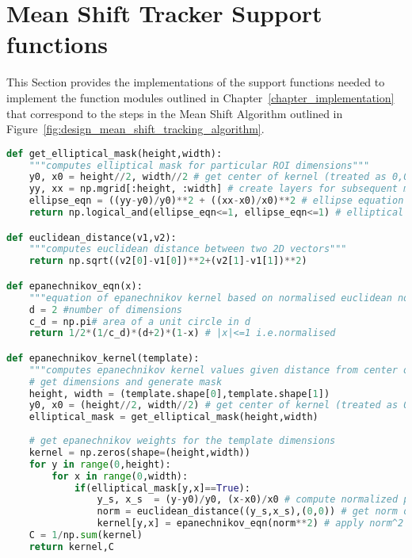 \section{Mean Shift Tracker Support functions}\label{supportMS}
This Section provides the implementations of the support functions needed to
implement the function modules outlined in Chapter~\ref{chapter_implementation}
that correspond to the steps in the Mean Shift Algorithm outlined in
Figure~\ref{fig:design_mean_shift_tracking_algorithm}.

\begin{lstlisting}[language=Python, caption={Additional functions for Mean Shift Tracker Impementation}, captionpos=b, label={lst:support_MS}]
def get_elliptical_mask(height,width):
    """computes elliptical mask for particular ROI dimensions"""
    y0, x0 = height//2, width//2 # get center of kernel (treated as 0,0) - note these are also hy and hx 
    yy, xx = np.mgrid[:height, :width] # create layers for subsequent mask
    ellipse_eqn = ((yy-y0)/y0)**2 + ((xx-x0)/x0)**2 # ellipse equation
    return np.logical_and(ellipse_eqn<=1, ellipse_eqn<=1) # elliptical mask for kernel

def euclidean_distance(v1,v2):
    """computes euclidean distance between two 2D vectors"""
    return np.sqrt((v2[0]-v1[0])**2+(v2[1]-v1[1])**2)

def epanechnikov_eqn(x):
    """equation of epanechnikov kernel based on normalised euclidean norm squared"""
    d = 2 #number of dimensions
    c_d = np.pi# area of a unit circle in d  
    return 1/2*(1/c_d)*(d+2)*(1-x) # |x|<=1 i.e.normalised

def epanechnikov_kernel(template):
    """computes epanechnikov kernel values given distance from center of kernel"""    
    # get dimensions and generate mask
    height, width = (template.shape[0],template.shape[1])
    y0, x0 = (height//2, width//2) # get center of kernel (treated as 0,0) - note these are also hy and hx 
    elliptical_mask = get_elliptical_mask(height,width) 
    
    # get epanechnikov weights for the template dimensions
    kernel = np.zeros(shape=(height,width)) 
    for y in range(0,height):
        for x in range(0,width):
            if(elliptical_mask[y,x]==True):
                y_s, x_s  = (y-y0)/y0, (x-x0)/x0 # compute normalized point 
                norm = euclidean_distance((y_s,x_s),(0,0)) # get norm of normalized point (x_i*) i.e y0=hy, x0=hx
                kernel[y,x] = epanechnikov_eqn(norm**2) # apply norm^2 to epanechnikov equation
    C = 1/np.sum(kernel)
    return kernel,C
\end{lstlisting}

